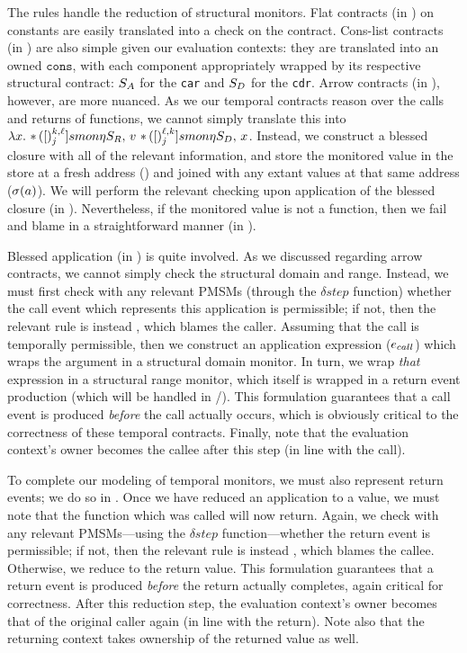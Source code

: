 %
The  rules handle the reduction of structural monitors.
%
Flat contracts (in ) on constants are easily translated into a check on the contract.
%
Cons-list contracts (in ) are also simple given our evaluation contexts: they are translated into an owned $\mathtt{cons}$, with each component appropriately wrapped by its respective structural contract: $S_A$ for the \texttt{car} and $S_D$ for the \texttt{cdr}.
%
%
Arrow contracts (in ), however, are more nuanced.
%
As we our temporal contracts reason over the calls and returns of functions, we cannot simply translate this into \eg\ $\lambda x.\  {\tt *}{\,}({[})^{k,\ell}_{j}]{smon}{\eta}{S_R,\,  v\ {\tt *}{\,}({[})^{\ell,k}_{j}]{smon}{\eta}{S_D,\, x} }$.
%
Instead, we construct a blessed closure with all of the relevant information, and store the monitored value in the store at a fresh address (\maddr) and joined with any extant values at that same address ($\sigma(a)$).
%
We will perform the relevant checking upon application of the blessed closure (in ).
%
Nevertheless, if the monitored value is not a function, then we fail and blame in a straightforward manner (in ).
%

%
Blessed application (in ) is quite involved.
%
As we discussed regarding arrow contracts, we cannot simply check the structural domain and range.
%
Instead, we must first check with any relevant PMSMs (through the $\delta{}step$ function) whether the call event which represents this application is permissible; if not, then the relevant rule is instead , which blames the caller.
%
Assuming that the call is temporally permissible, then we construct an application expression ($e_{call}$) which wraps the argument in a structural domain monitor.
%
In turn, we wrap \emph{that} expression in a structural range monitor, which itself is wrapped in a return event production (which will be handled in /).
%
This formulation guarantees that a call event is produced \emph{before} the call actually occurs, which is obviously critical to the correctness of these temporal contracts.
%
Finally, note that the evaluation context's owner becomes the callee after this step (in line with the call).
%

%
To complete our modeling of temporal monitors, we must also represent return events; we do so in .
%
Once we have reduced an application to a value, we must note that the function which was called will now return.
%
Again, we check with any relevant PMSMs---using the $\delta{}step$ function---whether the return event is permissible; if not, then the relevant rule is instead , which blames the callee.
%
Otherwise, we reduce to the return value.
%
This formulation guarantees that a return event is produced \emph{before} the return actually completes, again critical for correctness.
%
After this reduction step, the evaluation context's owner becomes that of the original caller again (in line with the return).
%
Note also that the returning context takes ownership of the returned value as well.
%

